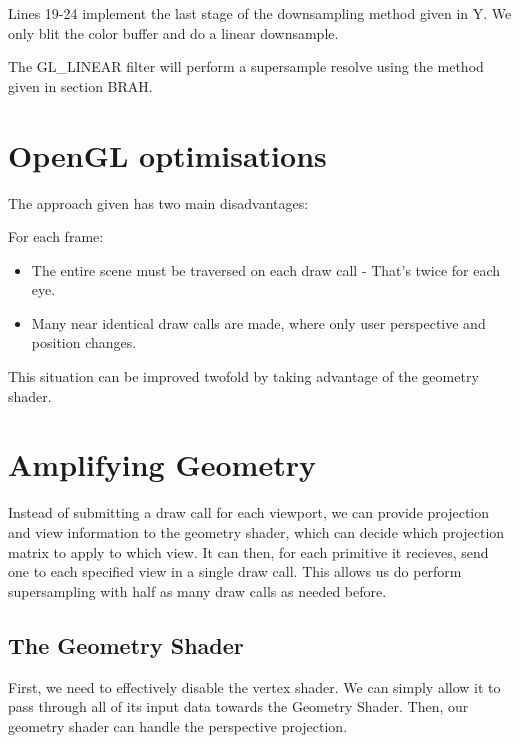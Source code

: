 \documentclass[12pt,a4paper,twoside,openright]{report}
\begin{document}
Lines 19-24 implement the last stage of the downsampling method given in Y. We only blit the color buffer and do a linear downsample. 

The GL\_LINEAR filter will perform a supersample resolve using the method given in section BRAH.


\section{OpenGL optimisations}

The approach given has two main disadvantages:

For each frame:
\begin{itemize}
  \item The entire scene must be traversed on each draw call - That's twice for each eye.
  \item Many near identical draw calls are made, where only user perspective and position changes.
\end{itemize}

This situation can be improved twofold by taking advantage of the geometry shader.

\section{Amplifying Geometry}

Instead of submitting a draw call for each viewport, we can provide projection and view information to the geometry shader, which can decide which projection matrix to apply to which view. It can then, for each primitive it recieves, send one to each specified view in a single draw call. This allows us do perform supersampling with half as many draw calls as needed before.

\subsection{The Geometry Shader}

First, we need to effectively disable the vertex shader. We can simply allow it to pass through all of its input data towards the Geometry Shader.
Then, our geometry shader can handle the perspective projection.
\end{document}
